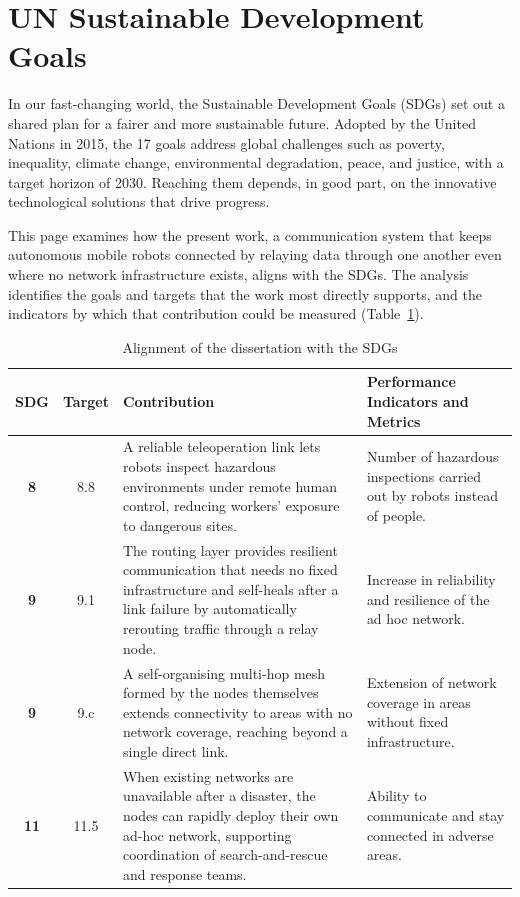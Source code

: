 
\chapter*{UN Sustainable Development Goals} \label{chap:UnitedNations}

In our fast-changing world, the Sustainable Development Goals (SDGs) set out a shared plan for a fairer and more sustainable future. Adopted by the United Nations in 2015, the 17 goals address global challenges such as poverty, inequality, climate change, environmental degradation, peace, and justice, with a target horizon of 2030. Reaching them depends, in good part, on the innovative technological solutions that drive progress.

This page examines how the present work, a communication system that keeps autonomous mobile robots connected by relaying data through one another even where no network infrastructure exists, aligns with the SDGs. The analysis identifies the goals and targets that the work most directly supports, and the indicators by which that contribution could be measured (Table~\ref{tab:sdg}).

\begin{table}[h]
\centering
\small
\caption{Alignment of the dissertation with the SDGs}
\label{tab:sdg}
\begin{tabular}{|c|c|p{55mm}|p{49mm}|}
\hline
\textbf{SDG} & \textbf{Target} & \textbf{Contribution} & \textbf{Performance Indicators and Metrics} \\
\hline\hline
\textbf{8}  & 8.8  & A reliable teleoperation link lets robots inspect hazardous environments under remote human control, reducing workers' exposure to dangerous sites. & Number of hazardous inspections carried out by robots instead of people. \\
\hline
\textbf{9}  & 9.1  & The routing layer provides resilient communication that needs no fixed infrastructure and self-heals after a link failure by automatically rerouting traffic through a relay node. & Increase in reliability and resilience of the ad hoc network. \\
\hline
\textbf{9}  & 9.c  & A self-organising multi-hop mesh formed by the nodes themselves extends connectivity to areas with no network coverage, reaching beyond a single direct link. & Extension of network coverage in areas without fixed infrastructure. \\
\hline
\textbf{11} & 11.5 & When existing networks are unavailable after a disaster, the nodes can rapidly deploy their own ad-hoc network, supporting coordination of search-and-rescue and response teams. & Ability to communicate and stay connected in adverse areas. \\
\hline
\end{tabular}
\end{table}
